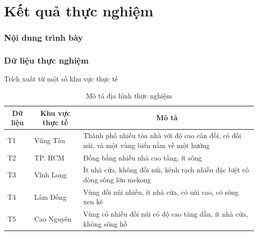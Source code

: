\section{Kết quả thực nghiệm}
\begin{frame}[noframenumbering]
    \frametitle{Nội dung trình bày}
    \tableofcontents[currentsection]
  \end{frame}
\begin{frame}
    \frametitle{Dữ liệu thực nghiệm}
    Trích xuất từ một số khu vực thực tế

    \begin{table}[]
        \begin{tabularx}{\textwidth}{|l|l|X|}
            \hline
            \multicolumn{1}{|c|}{\textbf{Dữ liệu}} & \multicolumn{1}{c|}{\textbf{Khu vực thực tế}} & \multicolumn{1}{c|}{\textbf{Mô tả}}                                                                 \\ \hline
            T1 & Vũng Tàu                             & Thành phố nhiều tòa nhà với độ cao cân đối, có đồi núi, và một vùng biển nằm về một hướng  \\ \hline
            T2 & TP. HCM                           & Đồng bằng nhiều nhà cao tầng, ít sông                            \\ \hline
            T3 & Vĩnh Long                            & Ít nhà cửa, không đồi núi, kênh rạch nhiều đặc biệt có dòng sông lớn mekong                \\ \hline
            T4 & Lâm Đồng                             & Vùng đồi núi nhiều, ít nhà cửa, có núi cao, có sông xen kẽ                                \\ \hline
            T5 & Cao Nguyên                           & Vùng có nhiều đồi núi có độ cao tăng dần, ít nhà cửa, không sông hồ                        \\ \hline
        \end{tabularx}
        \caption{Mô tả địa hình thực nghiệm}
    \end{table}

\end{frame}

